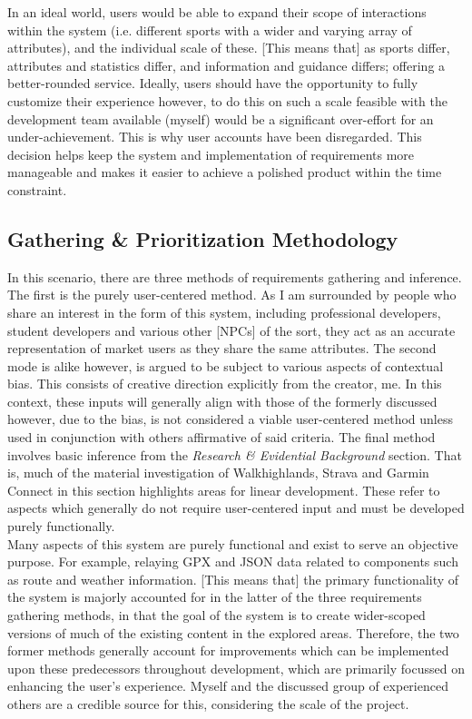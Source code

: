 \documentclass[11pt, english]{article}
\begin{document}
	In an ideal world, users would be able to expand their scope of interactions within the system (i.e. different sports with a wider and varying array of attributes), and the individual scale of these. [This means that] as sports differ, attributes and statistics differ, and information and guidance differs; offering a better-rounded service. Ideally, users should have the opportunity to fully customize their experience however, to do this on such a scale feasible with the development team available (myself) would be a significant over-effort for an under-achievement. This is why user accounts have been disregarded. This decision helps keep the system and implementation of requirements more manageable and makes it easier to achieve a polished product within the time constraint. 

	\subsection{Gathering \& Prioritization Methodology}

	In this scenario, there are three methods of requirements gathering and inference. The first is the purely user-centered method. As I am surrounded by people who share an interest in the form of this system, including professional developers, student developers and various other [NPCs] of the sort, they act as an accurate representation of market users as they share the same attributes. The second mode is alike however, is argued to be subject to various aspects of contextual bias. This consists of creative direction explicitly from the creator, me. In this context, these inputs will generally align with those of the formerly discussed however, due to the bias, is not considered a viable user-centered method unless used in conjunction with others affirmative of said criteria. The final method involves basic inference from the \textit{Research \& Evidential Background} section. That is, much of the material investigation of Walkhighlands, Strava and Garmin Connect in this section highlights areas for linear development. These refer to aspects which generally do not require user-centered input and must be developed purely functionally.\\

	Many aspects of this system are purely functional and exist to serve an objective purpose. For example, relaying GPX and JSON data related to components such as route and weather information. [This means that] the primary functionality of the system is majorly accounted for in the latter of the three requirements gathering methods, in that the goal of the system is to create wider-scoped versions of much of the existing content in the explored areas. Therefore, the two former methods generally account for improvements which can be implemented upon these predecessors throughout development, which are primarily focussed on enhancing the user's experience. Myself and the discussed group of experienced others are a credible source for this, considering the scale of the project.\\
\end{document}
